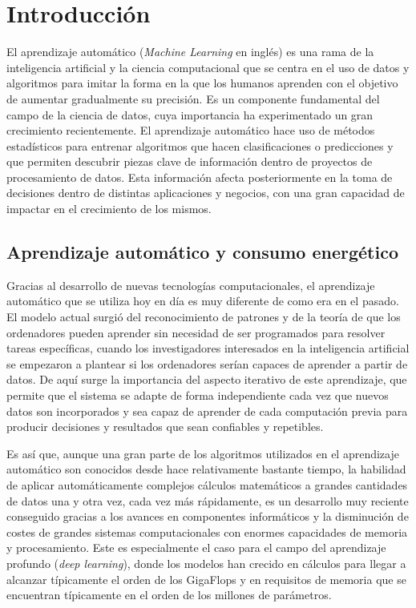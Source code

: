 \chapter{Introducción}
\label{sec:intro}

El aprendizaje automático (\emph{Machine Learning} en inglés) es una rama de la inteligencia artificial y la ciencia computacional que se centra en el uso de datos y algoritmos para imitar la forma en la que los humanos aprenden con el objetivo de aumentar gradualmente su precisión.
Es un componente fundamental del campo de la ciencia de datos, cuya importancia ha experimentado un gran crecimiento recientemente. 
El aprendizaje automático hace uso de métodos estadísticos para entrenar algoritmos que hacen clasificaciones o predicciones y que permiten descubrir piezas clave de información dentro de proyectos de procesamiento de datos. 
Esta información afecta posteriormente en la toma de decisiones dentro de distintas aplicaciones y negocios, con una gran capacidad de impactar en el crecimiento de los mismos.

\section{Aprendizaje automático y consumo energético}

Gracias al desarrollo de nuevas tecnologías computacionales, el aprendizaje automático que se utiliza hoy en día es muy diferente de como era en el pasado.
El modelo actual surgió del reconocimiento de patrones y de la teoría de que los ordenadores pueden aprender sin necesidad de ser programados para resolver tareas específicas, cuando los investigadores interesados en la inteligencia artificial se empezaron a plantear si los ordenadores serían capaces de aprender a partir de datos.
De aquí surge la importancia del aspecto iterativo de este aprendizaje, que permite que el sistema se adapte de forma independiente cada vez que nuevos datos son incorporados y sea capaz de aprender de cada computación previa para producir decisiones y resultados que sean confiables y repetibles.

Es así que, aunque una gran parte de los algoritmos utilizados en el aprendizaje automático son conocidos desde hace relativamente bastante tiempo, la habilidad de aplicar automáticamente complejos cálculos matemáticos a grandes cantidades de datos una y otra vez, cada vez más rápidamente, es un desarrollo muy reciente conseguido gracias a los avances en componentes informáticos y la disminución de costes de grandes sistemas computacionales con enormes capacidades de memoria y procesamiento.
Este es especialmente el caso para el campo del aprendizaje profundo (\emph{deep learning}), donde los modelos han crecido en cálculos para llegar a alcanzar típicamente el orden de los GigaFlops y en requisitos de memoria que se encuentran típicamente en el orden de los millones de parámetros.

